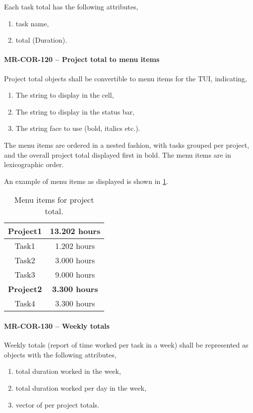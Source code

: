 Each task total has the following attributes,
\begin{enumerate}
\item task name,
\item total (Duration).
\end{enumerate}

\paragraph{MR-COR-120 -- Project total to menu items}
Project total objects shall be convertible to menu items for the TUI,
indicating,
\begin{enumerate}
\item The string to display in the cell,
\item The string to display in the status bar,
\item The string face to use (bold, italics etc.).
\end{enumerate}

The menu items are ordered in a nested fashion, with tasks grouped per
project, and the overall project total displayed first in bold.
The menu items are in lexicographic order.

An example of menu items as displayed is shown in
\cref{tab:project_total_menu_items}.

\begin{table} \caption{\label{tab:project_total_menu_items} Menu items for
    project total.}
  \begin{tabular}{| c | c |} \hline
    \textbf{Project1} & \textbf{13.202 hours} \\ \hline
    Task1 & 1.202 hours \\ \hline
    Task2 & 3.000 hours \\ \hline
    Task3 & 9.000 hours \\ \hline
    \textbf{Project2} & \textbf{3.300 hours} \\ \hline
    Task4 & 3.300 hours \\ \hline
  \end{tabular}
\end{table}

\paragraph{MR-COR-130 -- Weekly totals}
Weekly totals (report of time worked per task in a week) shall be represented
as objects with the following attributes,
\begin{enumerate}
\item total duration worked in the week,
\item total duration worked per day in the week,
\item vector of per project totals.
\end{enumerate}


